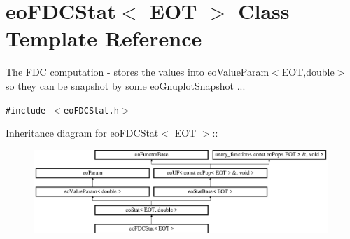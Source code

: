 \section{eo\-FDCStat$<$ EOT $>$ Class Template Reference}
\label{classeo_f_d_c_stat}
The FDC computation - stores the values into eo\-Value\-Param$<$EOT,double$>$ so they can be snapshot by some eo\-Gnuplot\-Snapshot ...  


{\tt \#include $<$eo\-FDCStat.h$>$}

Inheritance diagram for eo\-FDCStat$<$ EOT $>$::\begin{figure}[H]
\begin{center}
\leavevmode
\includegraphics[height=3.15315cm]{classeo_f_d_c_stat}
\end{center}
\end{figure}
